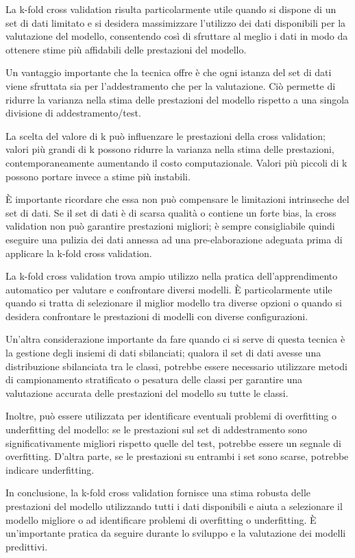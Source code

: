 La k-fold cross validation risulta particolarmente utile quando si dispone di un set di dati limitato e si desidera massimizzare l'utilizzo dei dati disponibili per la valutazione del modello, consentendo così di sfruttare al meglio i dati in modo da ottenere stime più affidabili delle prestazioni del modello.

Un vantaggio importante che la tecnica offre è che ogni istanza del set di dati viene sfruttata sia per l'addestramento che per la valutazione. Ciò permette di ridurre la varianza nella stima delle prestazioni del modello rispetto a una singola divisione di addestramento/test.

La scelta del valore di k può influenzare le prestazioni della cross validation; valori più grandi di k possono ridurre la varianza nella stima delle prestazioni, contemporaneamente aumentando il costo computazionale. Valori più piccoli di k possono portare invece a stime più instabili.

È importante ricordare che essa non può compensare le limitazioni intrinseche del set di dati. Se il set di dati è di scarsa qualità o contiene un forte bias, la cross validation non può garantire prestazioni migliori; è sempre consigliabile quindi eseguire una pulizia dei dati annessa ad una pre-elaborazione adeguata prima di applicare la k-fold cross validation. 

La k-fold cross validation trova ampio utilizzo nella pratica dell'apprendimento automatico per valutare e confrontare diversi modelli. È particolarmente utile quando si tratta di selezionare il miglior modello tra diverse opzioni o quando si desidera confrontare le prestazioni di modelli con diverse configurazioni.

Un'altra considerazione importante da fare quando ci si serve di questa tecnica è la gestione degli insiemi di dati sbilanciati; qualora il set di dati avesse una distribuzione sbilanciata tra le classi, potrebbe essere necessario utilizzare metodi di campionamento stratificato o pesatura delle classi per garantire una valutazione accurata delle prestazioni del modello su tutte le classi.

Inoltre, può essere utilizzata per identificare eventuali problemi di overfitting o underfitting del modello: se le prestazioni sul set di addestramento sono significativamente migliori rispetto quelle del test, potrebbe essere un segnale di overfitting. D'altra parte, se le prestazioni su entrambi i set sono scarse, potrebbe indicare underfitting.

In conclusione, la k-fold cross validation fornisce una stima robusta delle prestazioni del modello utilizzando tutti i dati disponibili e aiuta a selezionare il modello migliore o ad identificare problemi di overfitting o underfitting. È un'importante pratica da seguire durante lo sviluppo e la valutazione dei modelli predittivi.


